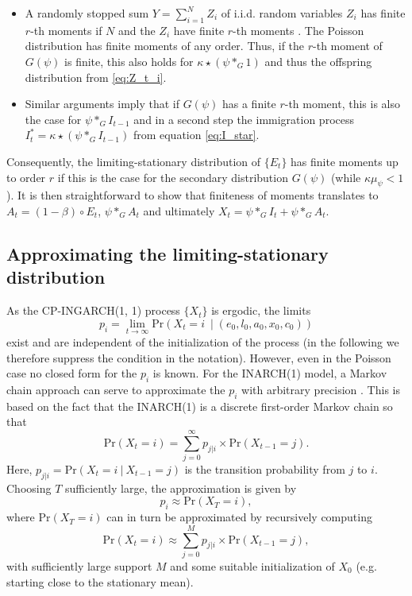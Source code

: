 \documentclass{article}
\begin{document}
\begin{itemize}
\item A randomly stopped sum $Y = \sum_{i = 1}^N Z_i$ of i.i.d. random variables $Z_i$ has finite $r$-th moments if $N$ and the $Z_i$ have finite $r$-th moments \cite[Theorem 5.2]{Gut2009}. The Poisson distribution has finite moments of any order. Thus, if the $r$-th moment of $G(\psi)$ is finite, this also holds for $\kappa \star (\psi *_G 1)$ and thus the offspring distribution from \eqref{eq:Z_t_i}.
\item Similar arguments imply that if $G(\psi)$ has a finite $r$-th moment, this is also the case for $\psi *_G I_{t - 1}$ and in a second step the immigration process $I^*_t = \kappa \star(\psi *_G I_{t - 1})$ from equation \eqref{eq:I_star}.
\end{itemize}
Consequently, the limiting-stationary distribution of $\{E_t\}$ has finite moments up to order $r$ if this is the case for the secondary distribution $G(\psi)$ (while $\kappa\mu_\psi < 1$). It is then straightforward to show that finiteness of moments translates to $A_t = (1 - \beta) \circ E_t$, $\psi *_G A_t$ and ultimately $X_t = \psi *_G I_t + \psi *_G A_t$.
%
%

\subsection{Approximating the limiting-stationary distribution}

As the CP-INGARCH(1, 1) process $\{X_t\}$ is ergodic, the limits %
$$
p_i = \lim_{t \rightarrow \infty} \text{Pr}(X_t = i \ \mid (e_0, l_0, a_0, x_0, c_0))
$$
exist and are independent of the initialization of the process (in the following we therefore suppress the condition in the notation). However, even in the Poisson case no closed form for the $p_i$ is known. For the INARCH(1) model, a Markov chain approach can serve to approximate the $p_i$ with arbitrary precision \cite{Weiss2010}. This is based on the fact that the INARCH(1) is a discrete first-order Markov chain so that
$$
\text{Pr}(X_t = i) = \sum_{j = 0}^\infty p_{j|i} \times \text{Pr}(X_{t - 1} = j).
$$
Here, $p_{j|i} = \text{Pr}(X_t = i \ | \ X_{t - 1} = j) $ is the transition probability from $j$ to $i$. Choosing $T$ sufficiently large, the approximation is given by
$$
p_i \approx \text{Pr}(X_T = i),
$$
where $\text{Pr}(X_T = i)$ can in turn be approximated by recursively computing
$$
\text{Pr}(X_t = i) \approx \sum_{j = 0}^M p_{j|i} \times \text{Pr}(X_{t - 1} = j),
$$
with sufficiently large support $M$ and some suitable initialization of $X_0$ (e.g. starting close to the stationary mean).
\end{document}

